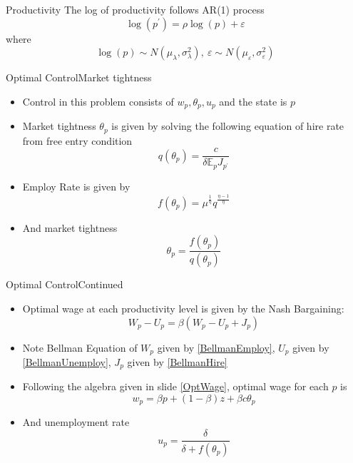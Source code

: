 \documentclass{beamer}
\begin{document}
\begin{frame}{Productivity}
    The log of productivity follows AR(1) process
    \begin{equation}\label{productivityprocess}
    \log(p^\prime) = \rho \log(p) + \varepsilon 
    \end{equation}
    where \[\log(p) \sim N(\mu_\lambda, \sigma^2_\lambda),\ 
    \varepsilon \sim N(\mu_\varepsilon,\sigma^2_\varepsilon)\]
\end{frame}


\begin{frame}{Optimal Control}{Market tightness}
    \begin{itemize}
        \item Control in this problem consists of \(w_p, \theta_p, u_p\) and the state is \(p\)
        \item Market tightness \(\theta_p\) is given by solving the following equation of hire rate from free entry condition 
            \begin{equation}\label{HireRate}
            q(\theta_p) = \frac{c}{\delta \mathbb{E}_p J_{p^\prime}}\end{equation}
        \item Employ Rate is given by \begin{equation}\label{EmployRate}
            f(\theta_p) = \mu^\frac{1}{\eta} q^\frac{\eta-1}{\eta}\end{equation}
        \item And market tightness \begin{equation}
            \label{MarketTightness}
            \theta_p = \frac{f(\theta_p)}{q(\theta_p)}
            \end{equation}
    \end{itemize}
\end{frame}

\begin{frame}{Optimal Control}{Continued}
    \begin{itemize}
        \item Optimal wage at each productivity level is given by the Nash Bargaining: 
        \begin{equation}\label{Nash}W_p - U_p = \beta (W_p - U_p + J_p)\end{equation}
        \item Note Bellman Equation of \(W_p\) given by \ref{BellmanEmploy}, \(U_p\) given by \ref{BellmanUnemploy}, \(J_p\) given by \ref{BellmanHire}
        \item Following the algebra given in slide \ref{OptWage}, optimal wage for each \(p\) is \begin{equation}\label{OptimalWage}
            w_p = \beta p + (1-\beta)z + \beta c \theta_p\end{equation}
        \item And unemployment rate \begin{equation}\label{UnemployRate}
            u_p = \frac{\delta}{\delta + f(\theta_p)}
        \end{equation}
    \end{itemize}
\end{frame}
\end{document}
